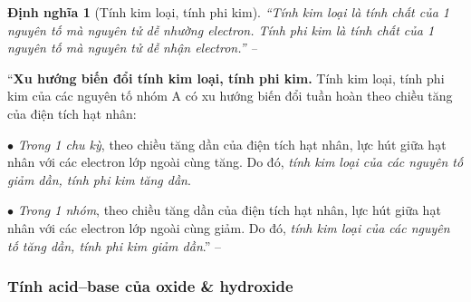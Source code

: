 \documentclass{article}
\numberwithin{equation}{section}
\newtheorem{dinhnghia}{Định nghĩa}[section]
\begin{document}
\begin{dinhnghia}[Tính kim loại, tính phi kim]
	``\emph{Tính kim loại} là tính chất của 1 nguyên tố mà nguyên tử dễ nhường electron. \emph{Tính phi kim} là tính chất của 1 nguyên tố mà nguyên tử dễ nhận electron.'' -- \cite[p. 45]{SGK_Hoa_Hoc_10_Chan_Troi_Sang_Tao}
\end{dinhnghia}
``\textbf{Xu hướng biến đổi tính kim loại, tính phi kim.} Tính kim loại, tính phi kim của các nguyên tố nhóm A có xu hướng biến đổi tuần hoàn theo chiều tăng của điện tích hạt nhân:
\begin{enumerate*}
	\item[$\bullet$] \textit{Trong 1 chu kỳ}, theo chiều tăng dần của điện tích hạt nhân, lực hút giữa hạt nhân với các electron lớp ngoài cùng tăng. Do đó, \textit{tính kim loại của các nguyên tố giảm dần, tính phi kim tăng dần}.
	\item[$\bullet$] \textit{Trong 1 nhóm}, theo chiều tăng dần của điện tích hạt nhân, lực hút giữa hạt nhân với các electron lớp ngoài cùng giảm. Do đó, \textit{tính kim loại của các nguyên tố tăng dần, tính phi kim giảm dần}.'' -- \cite[p. 46]{SGK_Hoa_Hoc_10_Chan_Troi_Sang_Tao}
\end{enumerate*}

\subsubsection{Tính acid--base của oxide \& hydroxide}
\end{document}
